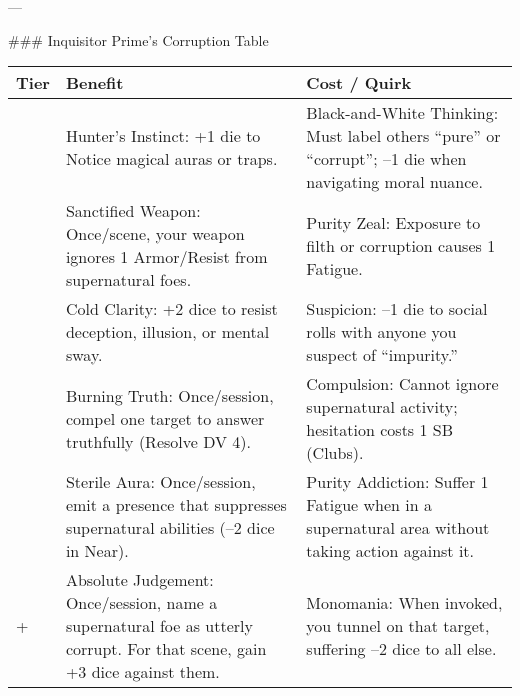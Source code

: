 ---

### Inquisitor Prime’s Corruption Table

\begin{longtable}{>{\raggedright\arraybackslash}p{1cm} p{5cm} p{5cm}}
\toprule
\textbf{Tier} & \textbf{Benefit} & \textbf{Cost / Quirk} \\
\midrule
1 & Hunter’s Instinct: +1 die to Notice magical auras or traps. & Black-and-White Thinking: Must label others “pure” or “corrupt”; –1 die when navigating moral nuance. \\
\midrule
2 & Sanctified Weapon: Once/scene, your weapon ignores 1 Armor/Resist from supernatural foes. & Purity Zeal: Exposure to filth or corruption causes 1 Fatigue. \\
\midrule
3 & Cold Clarity: +2 dice to resist deception, illusion, or mental sway. & Suspicion: –1 die to social rolls with anyone you suspect of “impurity.” \\
\midrule
4 & Burning Truth: Once/session, compel one target to answer truthfully (Resolve DV 4). & Compulsion: Cannot ignore supernatural activity; hesitation costs 1 SB (Clubs). \\
\midrule
5 & Sterile Aura: Once/session, emit a presence that suppresses supernatural abilities (–2 dice in Near). & Purity Addiction: Suffer 1 Fatigue when in a supernatural area without taking action against it. \\
\midrule
6+ & Absolute Judgement: Once/session, name a supernatural foe as utterly corrupt. For that scene, gain +3 dice against them. & Monomania: When invoked, you tunnel on that target, suffering –2 dice to all else. \\
\bottomrule
\end{longtable}